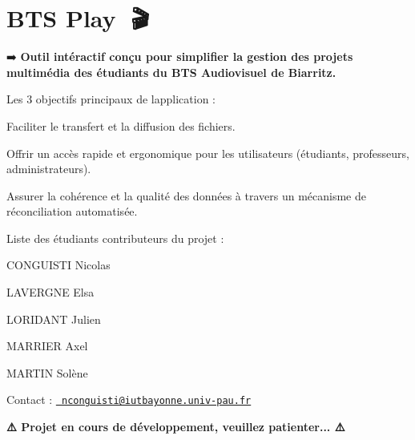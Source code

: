 \chapter{BTS Play 🎥🎬}
\hypertarget{md_README}{}\label{md_README}
\label{md_README_autotoc_md0}%
%


➡️ {\bfseries{Outil intéractif conçu pour simplifier la gestion des projets multimédia des étudiants du BTS Audiovisuel de Biarritz.}}

Les 3 objectifs principaux de l\textquotesingle{}application \+:
\begin{DoxyItemize}
\item Faciliter le transfert et la diffusion des fichiers.\+ 
\item Offrir un accès rapide et ergonomique pour les utilisateurs (étudiants, professeurs, administrateurs). 
\item Assurer la cohérence et la qualité des données à travers un mécanisme de réconciliation automatisée.
\end{DoxyItemize}

Liste des étudiants contributeurs du projet \+:
\begin{DoxyItemize}
\item CONGUISTI Nicolas
\item LAVERGNE Elsa
\item LORIDANT Julien
\item MARRIER Axel
\item MARTIN Solène
\end{DoxyItemize}

Contact \+: \href{mailto:nconguisti@iutbayonne.univ-pau.fr}{\texttt{ nconguisti@iutbayonne.\+univ-\/pau.\+fr}}

{\bfseries{⚠️ Projet en cours de développement, veuillez patienter... ⚠️}} 